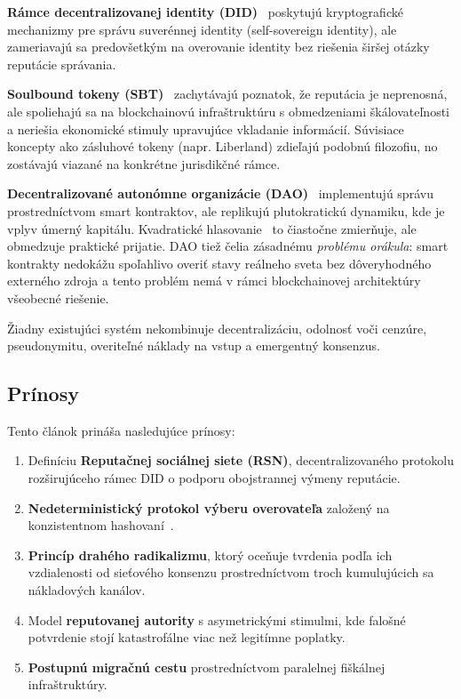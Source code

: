 \documentclass[11pt,a4paper,twocolumn]{article}
\begin{document}
\textbf{Rámce decentralizovanej identity (DID)}~\cite{did2022} poskytujú kryptografické mechanizmy pre správu suverénnej identity (self-sovereign identity), ale zameriavajú sa predovšetkým na overovanie identity bez riešenia širšej otázky reputácie správania.

\textbf{Soulbound tokeny (SBT)}~\cite{weyl2022} zachytávajú poznatok, že reputácia je neprenosná, ale spoliehajú sa na blockchainovú infraštruktúru s obmedzeniami škálovateľnosti a neriešia ekonomické stimuly upravujúce vkladanie informácií. Súvisiace koncepty ako zásluhové tokeny (napr. Liberland) zdieľajú podobnú filozofiu, no zostávajú viazané na konkrétne jurisdikčné rámce.

\textbf{Decentralizované autonómne organizácie (DAO)}~\cite{buterin2014} implementujú správu prostredníctvom smart kontraktov, ale replikujú plutokratickú dynamiku, kde je vplyv úmerný kapitálu. Kvadratické hlasovanie~\cite{buterin2019} to čiastočne zmierňuje, ale obmedzuje praktické prijatie. DAO tiež čelia zásadnému \emph{problému orákula}: smart kontrakty nedokážu spoľahlivo overiť stavy reálneho sveta bez dôveryhodného externého zdroja a tento problém nemá v rámci blockchainovej architektúry všeobecné riešenie.

Žiadny existujúci systém nekombinuje decentralizáciu, odolnosť voči cenzúre, pseudonymitu, overiteľné náklady na vstup a emergentný konsenzus.

\subsection{Prínosy}

Tento článok prináša nasledujúce prínosy:
\begin{enumerate}[nosep]
\item Definíciu \textbf{Reputačnej sociálnej siete (RSN)}, decentralizovaného protokolu rozširujúceho rámec DID o podporu obojstrannej výmeny reputácie.
\item \textbf{Nedeterministický protokol výberu overovateľa} založený na konzistentnom hashovaní~\cite{karger1997}.
\item \textbf{Princíp drahého radikalizmu}, ktorý oceňuje tvrdenia podľa ich vzdialenosti od sieťového konsenzu prostredníctvom troch kumulujúcich sa nákladových kanálov.
\item Model \textbf{reputovanej autority} s asymetrickými stimulmi, kde falošné potvrdenie stojí katastrofálne viac než legitímne poplatky.
\item \textbf{Postupnú migračnú cestu} prostredníctvom paralelnej fiškálnej infraštruktúry.
\end{enumerate}
\end{document}
